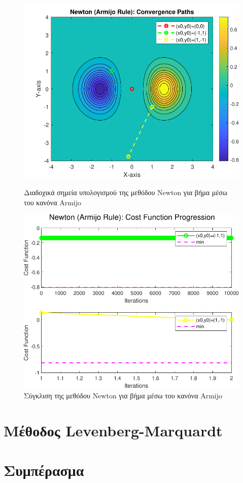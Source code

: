\documentclass[a4paper,12pt]{article}
\begin{document}
\begin{figure}[h]
    \centering
    \begin{minipage}{0.47\textwidth}
        \centering
        \includegraphics[width=1\linewidth]{plot/newton_armijo_rule_contour.pdf}
        \caption{\small Διαδοχικά σημεία υπολογισμού της μεθόδου  Newton  για βήμα μέσω του κανόνα  Armijo }
        \label{fig:newton_armijo_rule_contour}
    \end{minipage} \hfill
    \begin{minipage}{0.47\textwidth}
        \centering
        \includegraphics[width=1\linewidth]{plot/newton_armijo_rule_costs.pdf}
        \caption{\small Σύγκλιση της μεθόδου  Newton  για βήμα μέσω του κανόνα  Armijo }
        \label{fig:newton_armijo_rule_costs}
    \end{minipage}
\end{figure}

\section*{Μέθοδος  Levenberg-Marquardt}


\section*{Συμπέρασμα}
\end{document}
